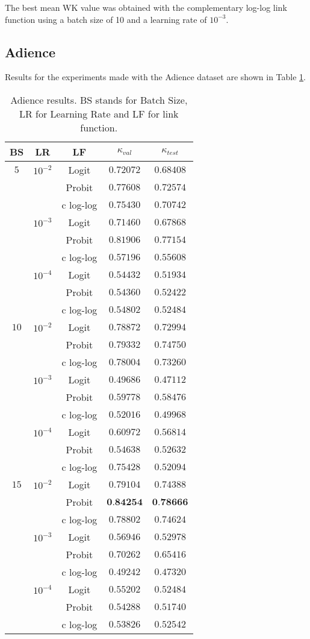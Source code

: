 \documentclass[journal]{IEEEtran}
\begin{document}
	The best mean WK value was obtained with the complementary log-log link function using a batch size of 10 and a learning rate of $10^{-3}$.
	
	\subsection{Adience}
	Results for the experiments made with the Adience dataset are shown in Table \ref{table:Adienceresults}.
	
	\begin{table}[!t]
		\caption{Adience results. BS stands for Batch Size, LR for Learning Rate and LF for link function.}
		\label{table:Adienceresults}
		\footnotesize
		\centering
		\begin{tabular}{ccc|cc}
			BS & LR & LF & $\kappa_{val}$ & $\kappa_{test}$\\\hline
			$5$ & $10^{-2}$ & Logit & $0.72072$ & $0.68408$\\
			& & Probit & $0.77608$ & $0.72574$\\
			& & c log-log & $0.75430$ & $0.70742$\\
			& $10^{-3}$ & Logit & $0.71460$ & $0.67868$\\
			& & Probit & $0.81906$ & $0.77154$\\
			& & c log-log & $0.57196$ & $0.55608$\\
			& $10^{-4}$ & Logit & $0.54432$ & $0.51934$\\
			& & Probit & $0.54360$ & $0.52422$\\
			& & c log-log & $0.54802$ & $0.52484$\\
			$10$ & $10^{-2}$ & Logit & $0.78872$ & $0.72994$\\
			& & Probit & $0.79332$ & $0.74750$\\
			& & c log-log & $0.78004$ & $0.73260$\\
			& $10^{-3}$ & Logit & $0.49686$ & $0.47112$\\
			& & Probit & $0.59778$ & $0.58476$\\
			& & c log-log & $0.52016$ & $0.49968$\\
			& $10^{-4}$ & Logit & $0.60972$ & $0.56814$\\
			& & Probit & $0.54638$ & $0.52632$\\
			& & c log-log & $0.75428$ & $0.52094$\\
			$15$ & $10^{-2}$ & Logit & $0.79104$ & $0.74388$\\
			& & Probit & $\textbf{0.84254}$ & $\textbf{0.78666}$\\
			& & c log-log & $0.78802$ & $0.74624$\\
			& $10^{-3}$ & Logit & $0.56946$ & $0.52978$\\
			& & Probit & $0.70262$ & $0.65416$\\
			& & c log-log & $0.49242$ & $0.47320$\\
			& $10^{-4}$ & Logit & $0.55202$ & $0.52484$\\
			& & Probit & $0.54288$ & $0.51740$\\
			& & c log-log & $0.53826$ & $0.52542$
		\end{tabular}
		
	\end{table}
	
\end{document}
